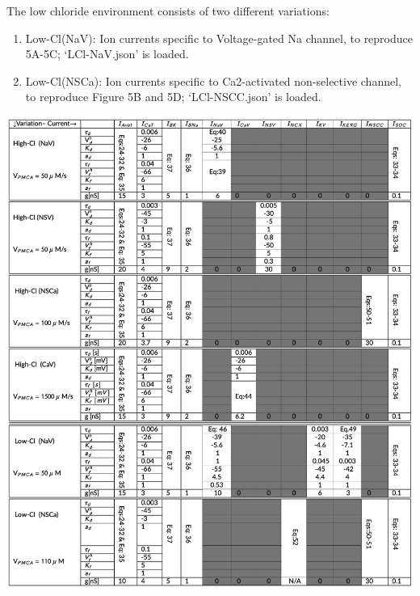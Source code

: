 \documentclass[fleqn,10pt]{physiome}
\begin{document}
The low chloride environment consists of two different variations:
\begin{enumerate}
\item Low-Cl(NaV): Ion currents specific to Voltage-gated Na channel, to reproduce 5A-5C; `LCl-NaV.json' is loaded.
\item Low-Cl(NSCa): Ion currents specific to Ca2-activated non-selective channel, to reproduce  Figure 5B and 5D; `LCl-NSCC.json' is loaded.
\end{enumerate}

\begin{table}[ht!]
\caption{Parameters are categorized according to each different variation. There are six different variations. These parameters are collected from \cite[Tables 2A and 2B]{lees2014computational}, and some from the appendix of the primary paper.}\label{tab:variations}
\includegraphics{table3.png}
\centering
{}
\end{table}
\end{document}
